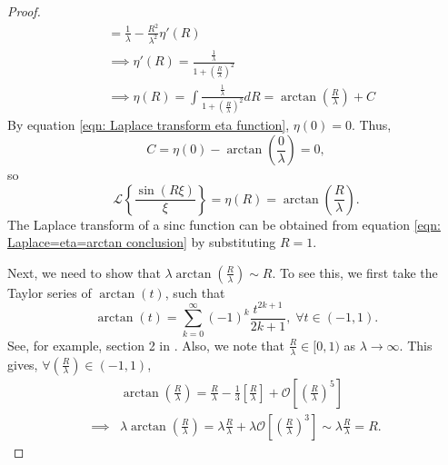 \documentclass[%
 reprint,
 amsmath,amssymb,
 aps,
]{revtex4-2}
\begin{document}
\begin{proof}
\begin{align*}
    & = \frac{1}{\lambda} - \frac{R^2}{\lambda^2} \eta'(R)\\
    & \implies \eta'(R) = \frac{\frac{1}{\lambda}}{1 + \left(\frac{R}{\lambda} \right)^2}\\
    & \implies \eta(R) = \int \frac{\frac{1}{\lambda}}{1 + \left(\frac{R}{\lambda} \right)^2} dR = \arctan\left(\frac{R}{\lambda} \right) + C
\end{align*}
By equation \eqref{eqn: Laplace transform eta function}, $\eta(0) = 0$. Thus,
\begin{equation*}
    C = \eta(0) - \arctan\left(\frac{0}{\lambda} \right) = 0,
\end{equation*}
so
\begin{equation} \label{eqn: Laplace=eta=arctan conclusion}
    \mathcal{L}\left\{\frac{\sin(R\xi)}{\xi}\right\} = \eta(R) = \arctan\left(\frac{R}{\lambda} \right).
\end{equation}
The Laplace transform of a sinc function can be obtained from equation \eqref{eqn: Laplace=eta=arctan conclusion} by substituting $R=1$.

Next, we need to show that $\lambda \arctan\left(\frac{R}{\lambda} \right) \sim R$. To see this, we first take the Taylor series of $\arctan(t)$, such that
\begin{equation*}
    \arctan(t) = \sum_{k = 0}^\infty (-1)^k \frac{t^{2k+1}}{2k+1}, \; \forall t \in (-1, 1).
\end{equation*}
See, for example, section 2 in \cite{nimbran2015taylor}. Also, we note that $\displaystyle \frac{R}{\lambda} \in [0, 1)$ as $\lambda \to \infty$. This gives, $\displaystyle \forall \left(\frac{R}{\lambda}\right) \in (-1, 1)$,
\begin{align*}
    & \arctan\left(\frac{R}{\lambda} \right) 
    = \frac{R}{\lambda} - \frac{1}{3}\left[\frac{R}{\lambda} \right] + \mathcal{O}\left[\left(\frac{R}{\lambda} \right)^5 \right] \\
    \implies & \lambda \arctan\left(\frac{R}{\lambda} \right) = \lambda \frac{R}{\lambda} + \lambda \mathcal{O}\left[\left(\frac{R}{\lambda} \right)^3 \right] \sim \lambda \frac{R}{\lambda} = R.
\end{align*}
\end{proof}
\end{document}
